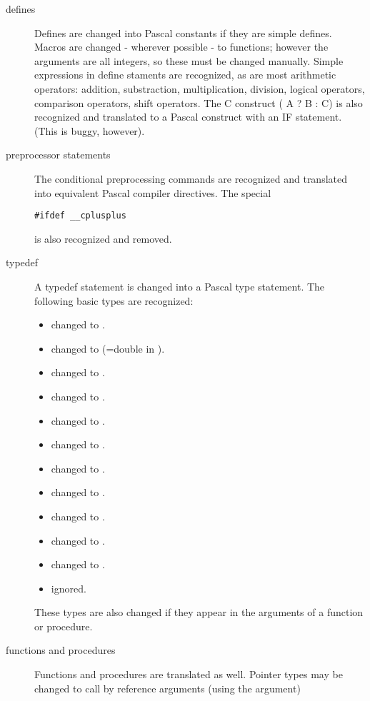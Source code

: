 \begin{description}
\item[defines] 
Defines are changed into Pascal constants if they are simple defines.
Macros are changed - wherever possible - to functions; however the arguments
are all integers, so these must be changed manually. Simple expressions 
in define staments are recognized, as are most arithmetic operators: 
addition, substraction, multiplication, division, logical operators, 
comparison operators, shift operators. The C construct ( A ? B : C)
is also recognized and translated to a Pascal construct with an IF
statement. (This is buggy, however).

\item[preprocessor statements]
The conditional preprocessing commands are recognized and translated into
equivalent Pascal compiler directives. The special 
\begin{verbatim}
#ifdef __cplusplus
\end{verbatim}
is also recognized and removed.
\item[typedef] A typedef statement is changed into a Pascal type statement. 
The following basic types are recognized:
\begin{itemize}
\item {} changed to .
\item {} changed to  (=double in \fpc).
\item {} changed to .
\item {} changed to .
\item {} changed to .
\item {} changed to . 
\item {} changed to .
\item {} changed to .
\item {} changed to .
\item {} changed to .
\item {} changed to .
\item {} ignored.
\end{itemize}
These types are also changed if they appear in the arguments of a function
or procedure.
\item[functions and procedures]
Functions and procedures are translated as well. Pointer types may be
changed to call by reference arguments (using the  argument) 

\end{description}
